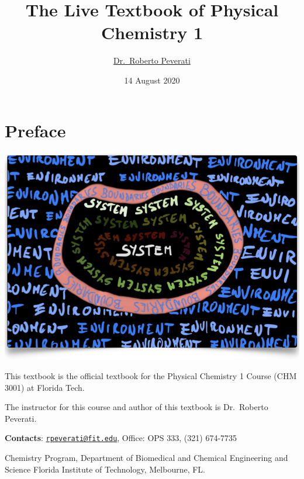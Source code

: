 \documentclass[
  9pt,
]{extbook}
\title{The Live Textbook of Physical Chemistry 1}
\author{\href{mailto:rpeverati@fit.edu}{Dr.~Roberto Peverati}}
\date{14 August 2020}
\let\oldmaketitle\maketitle
\theoremstyle{definition}
\theoremstyle{definition}
\theoremstyle{definition}
\theoremstyle{remark}
\begin{document}
\maketitle


\newpage

\let\maketitle\oldmaketitle

\renewcommand\thepage{\romannumeral\numexpr\value{page}-1\relax}

{
\setcounter{tocdepth}{1}
\tableofcontents
}
\renewcommand{\arraystretch}{1.8}

\hypertarget{preface}{%
\chapter*{Preface}\label{preface}}

\begin{center}\includegraphics[width=0.8\linewidth]{./img/OEP_Figures.000} \end{center}

This textbook is the official textbook for the Physical Chemistry 1 Course (CHM 3001) at Florida Tech.

The instructor for this course and author of this textbook is Dr.~Roberto Peverati.

\textbf{Contacts}: \href{mailto:rpeverati@fit.edu}{\nolinkurl{rpeverati@fit.edu}}, Office: OPS 333, (321) 674-7735

Chemistry Program, Department of Biomedical and Chemical Engineering and Science
Florida Institute of Technology, Melbourne, FL.
\end{document}
